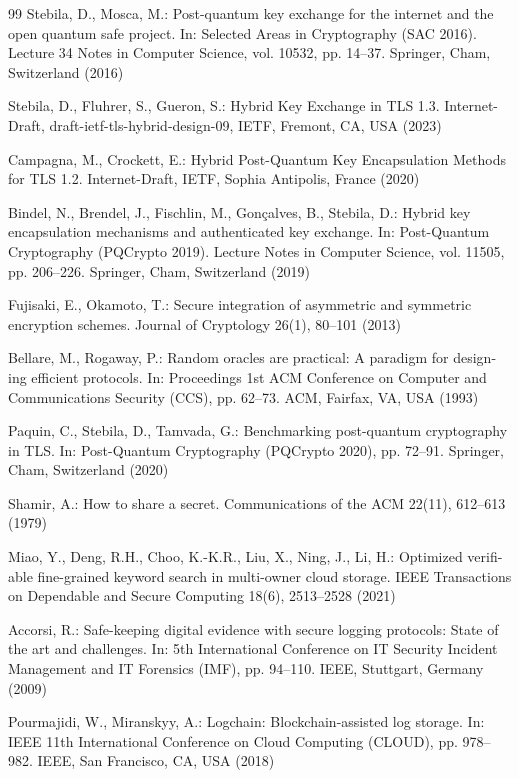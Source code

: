 \documentclass[5p,times]{elsarticle}
\begin{document}
\begin{thebibliography}{99}
Stebila, D., Mosca, M.: Post-quantum key exchange for the internet and the open quantum safe project. In: Selected Areas in Cryptography (SAC 2016). Lecture 34 Notes in Computer Science, vol. 10532, pp. 14--37. Springer, Cham, Switzerland (2016)

Stebila, D., Fluhrer, S., Gueron, S.: Hybrid Key Exchange in TLS 1.3. Internet- Draft, draft-ietf-tls-hybrid-design-09, IETF, Fremont, CA, USA (2023)

Campagna, M., Crockett, E.: Hybrid Post-Quantum Key Encapsulation Methods for TLS 1.2. Internet-Draft, IETF, Sophia Antipolis, France (2020)

Bindel, N., Brendel, J., Fischlin, M., Gon{\c{c}}alves, B., Stebila, D.: Hybrid key encapsulation mechanisms and authenticated key exchange. In: Post-Quantum Cryptography (PQCrypto 2019). Lecture Notes in Computer Science, vol. 11505, pp. 206--226. Springer, Cham, Switzerland (2019)

Fujisaki, E., Okamoto, T.: Secure integration of asymmetric and symmetric encryption schemes. Journal of Cryptology 26(1), 80--101 (2013)

Bellare, M., Rogaway, P.: Random oracles are practical: A paradigm for design- ing efficient protocols. In: Proceedings 1st ACM Conference on Computer and Communications Security (CCS), pp. 62--73. ACM, Fairfax, VA, USA (1993)

Paquin, C., Stebila, D., Tamvada, G.: Benchmarking post-quantum cryptography in TLS. In: Post-Quantum Cryptography (PQCrypto 2020), pp. 72--91. Springer, Cham, Switzerland (2020)

Shamir, A.: How to share a secret. Communications of the ACM 22(11), 612--613 (1979)

Miao, Y., Deng, R.H., Choo, K.-K.R., Liu, X., Ning, J., Li, H.: Optimized verifi- able fine-grained keyword search in multi-owner cloud storage. IEEE Transactions on Dependable and Secure Computing 18(6), 2513--2528 (2021)

Accorsi, R.: Safe-keeping digital evidence with secure logging protocols: State of the art and challenges. In: 5th International Conference on IT Security Incident Management and IT Forensics (IMF), pp. 94--110. IEEE, Stuttgart, Germany (2009)

Pourmajidi, W., Miranskyy, A.: Logchain: Blockchain-assisted log storage. In: IEEE 11th International Conference on Cloud Computing (CLOUD), pp. 978-- 982. IEEE, San Francisco, CA, USA (2018)


\end{thebibliography}
\end{document}
